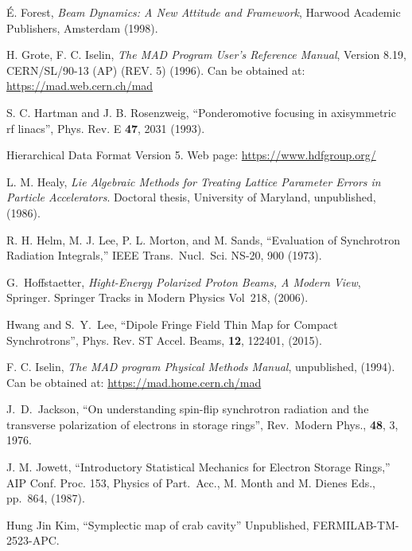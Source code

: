 \begin{thebibliography}{XXXXXXX99}
\'E. Forest, {\em Beam Dynamics: A New Attitude and Framework},
Harwood Academic Publishers, Amsterdam (1998).

H. Grote, F. C. Iselin, {\it The MAD Program User's Reference Manual},
Version 8.19, CERN/SL/90-13 (AP) (REV. 5) (1996). 
Can be obtained at:
\hfill\break
\hspace*{0.3in}
\url{https://mad.web.cern.ch/mad} 

S. C. Hartman and J. B. Rosenzweig, 
``Ponderomotive focusing in axisymmetric rf linacs'',
Phys. Rev. E {\bf 47}, 2031 (1993).

Hierarchical Data Format Version 5. Web page:
\hfill\break
\hspace*{0.3in} \url{https://www.hdfgroup.org/}

L. M. Healy, {\it Lie Algebraic Methods for Treating Lattice Parameter
Errors in Particle Accelerators}. Doctoral thesis, University of
Maryland, unpublished, (1986).

R. H. Helm, M. J. Lee, P. L. Morton, and M. Sands, 
``Evaluation of Synchrotron Radiation Integrals,''
IEEE Trans.~Nucl.~Sci. NS-20, 900 (1973).

G.~Hoffstaetter, 
{\it Hight-Energy Polarized Proton Beams, A Modern View}, 
Springer. Springer Tracks in Modern Physics Vol~218, (2006).

Hwang and S.~Y.~Lee, 
``Dipole Fringe Field Thin Map for Compact Synchrotrons'',
Phys. Rev. ST Accel. Beams, {\bf 12}, 122401, (2015).

F. C. Iselin, 
{\it The MAD program Physical Methods Manual}, 
unpublished, (1994). Can be obtained at: 
\hfill\break
\hspace*{0.3in}
\url{https://mad.home.cern.ch/mad}

J.~D.~Jackson,
``On understanding spin-flip synchrotron radiation and the transverse 
polarization of electrons in storage rings'',
Rev.\ Modern Phys., {\bf 48}, 3, 1976.

J. M. Jowett, 
``Introductory Statistical Mechanics for Electron Storage Rings,'' 
AIP Conf. Proc. 153, Physics of Part.\ Acc.,
M. Month and M. Dienes Eds., pp.~864, (1987).

Hung Jin Kim,
``Symplectic map of crab cavity''
Unpublished, FERMILAB-TM-2523-APC.


\end{thebibliography}
